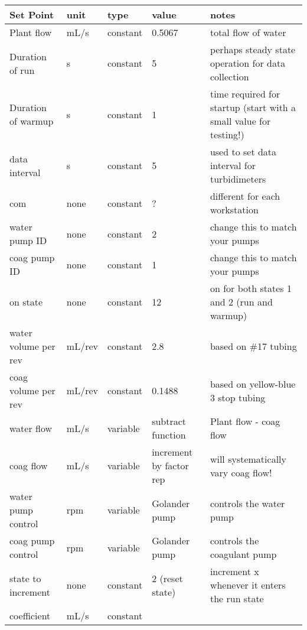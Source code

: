 \documentclass[letterpaper,10pt,english]{sphinxmanual}
\begin{document}
\begin{savenotes}\sphinxattablestart
\centering
{}
\label{\detokenize{ProCoDA/ProCoDA:id17}}\label{\detokenize{ProCoDA/ProCoDA:table-procoda-tutorial-method}}
\sphinxaftercaption
\begin{tabulary}{\linewidth}[t]{|T|T|T|T|T|}
\hline
\sphinxstyletheadfamily 
Set Point
&\sphinxstyletheadfamily 
unit
&\sphinxstyletheadfamily 
type
&\sphinxstyletheadfamily 
value
&\sphinxstyletheadfamily 
notes
\\
\hline
Plant flow
&
mL/s
&
constant
&
0.5067
&
total flow of water
\\
\hline
Duration of run
&
s
&
constant
&
5
&
perhaps steady state operation for data collection
\\
\hline
Duration of warmup
&
s
&
constant
&
1
&
time required for startup (start with a small value for testing!)
\\
\hline
data interval
&
s
&
constant
&
5
&
used to set data interval for turbidimeters
\\
\hline
com
&
none
&
constant
&
?
&
different for each workstation
\\
\hline
water pump ID
&
none
&
constant
&
2
&
change this to match your pumps
\\
\hline
coag pump ID
&
none
&
constant
&
1
&
change this to match your pumps
\\
\hline
on state
&
none
&
constant
&
12
&
on for both states 1 and 2 (run and warmup)
\\
\hline
water volume per rev
&
mL/rev
&
constant
&
2.8
&
based on \#17 tubing
\\
\hline
coag volume per rev
&
mL/rev
&
constant
&
0.1488
&
based on yellow-blue 3 stop tubing
\\
\hline
water flow
&
mL/s
&
variable
&
subtract function
&
Plant flow - coag flow
\\
\hline
coag flow
&
mL/s
&
variable
&
increment by factor rep
&
will systematically vary coag flow!
\\
\hline
water pump control
&
rpm
&
variable
&
Golander pump
&
controls the water pump
\\
\hline
coag pump control
&
rpm
&
variable
&
Golander pump
&
controls the coagulant pump
\\
\hline
state to increment
&
none
&
constant
&
2 (reset state)
&
increment x whenever it enters the run state
\\
\hline
coefficient
&
mL/s
&
constant

\end{tabulary}
\end{savenotes}
\end{document}
